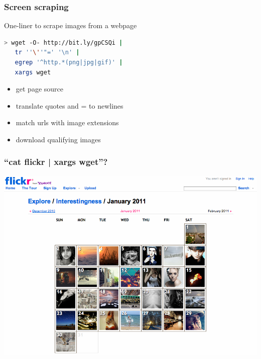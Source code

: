 \begin{frame}[fragile]
  \frametitle{Screen scraping}

    \begin{block}{One-liner to scrape images from a webpage}
        \begin{lstlisting}[language=bash]
> wget -O- http://bit.ly/gpCSQi | 
   tr ''\''"=' '\n' | 
   egrep '^http.*(png|jpg|gif)' | 
   xargs wget 
        \end{lstlisting}
    \end{block} 

    \pause
    \begin{itemize}
      \item get page source
      \item translate quotes and = to newlines
      \item match urls with image extensions
      \item download qualifying images
    \end{itemize}

\end{frame}


\begin{frame}
  \frametitle{``cat flickr \big| xargs wget''?}

  \begin{center}
    \includegraphics[width=\textwidth]{flickr_201101.png}
  \end{center}

\end{frame}


